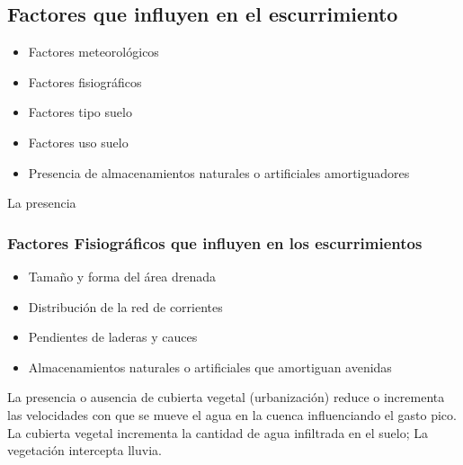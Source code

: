 \subsection{Factores que influyen en el escurrimiento}
\begin{itemize}
    \item Factores meteorológicos
    \item Factores fisiográficos
    \item Factores tipo suelo
    \item Factores uso suelo
    \item Presencia de almacenamientos naturales o artificiales amortiguadores
\end{itemize}
La presencia
\subsubsection{Factores Fisiográficos que influyen en los escurrimientos}
\begin{itemize}
    \item Tamaño y forma del área drenada
    \item Distribución de la red de corrientes
    \item Pendientes de laderas y cauces
    \item Almacenamientos naturales o artificiales que amortiguan avenidas
\end{itemize}
La presencia o ausencia de cubierta vegetal (urbanización) reduce o incrementa las velocidades con que se mueve el agua en la cuenca influenciando el gasto pico. La cubierta vegetal incrementa la cantidad de agua infiltrada en el suelo; La vegetación intercepta lluvia.


